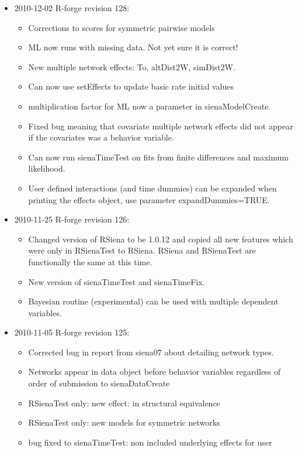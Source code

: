 \documentclass[a4paper,fleqn,11pt]{article}
\newcommand{\+}{\, + \,}
\begin{document}
{\begin{small}
\begin{itemize}
\begin{itemize}
  covariate effects etc.
\item Suppressed warning message when loading snow package.
\end{itemize}
\item 2010-12-02 R-forge revision 128:
\begin{itemize}
\item Corrections to scores for symmetric pairwise models
\item ML now runs with missing data. Not yet sure it is correct!
\item New multiple network effects: To, altDist2W, simDist2W.
\item Can now use setEffects to update basic rate initial values
\item multiplication factor for ML now a parameter in sienaModelCreate.
\item Fixed bug meaning that covariate multiple network effects did not appear
  if the covariates was a behavior variable.
\item Can now run sienaTimeTest on fits from finite differences and maximum
  likelihood.
\item User defined interactions (and time dummies) can be expanded
  when printing
  the effects object, use parameter expandDummies=TRUE.
\end{itemize}
\item 2010-11-25 R-forge revision 126:
\begin{itemize}
\item Changed version of RSiena to be 1.0.12 and copied all new features which
  were only in RSienaTest to RSiena. RSiena and RSienaTest are
  functionally the same at this time.
\item New version of sienaTimeTest and sienaTimeFix.
\item Bayesian routine (experimental) can be used with multiple dependent
  variables.
\end{itemize}
\item 2010-11-05 R-forge revision 125:
\begin{itemize}
\item Corrected bug in report from siena07 about detailing network types.
\item Networks appear in data object before behavior variables regardless of
order of submission to sienaDataCreate
\item RSienaTest only: new effect: in structural equivalence
\item RSienaTest only: new models for symmetric networks
\item bug fixed to sienaTimeTest: non included underlying effects for user

\end{itemize}
\end{itemize}
\end{small}}
\end{document}
